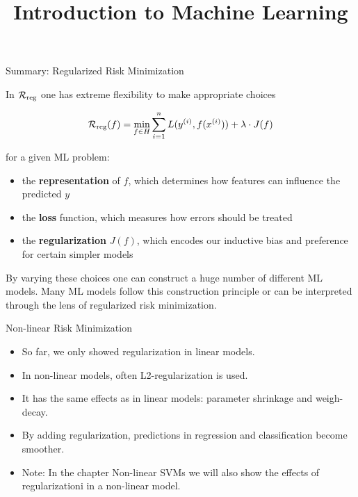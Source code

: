



\newcommand{\titlefigure}{figure_man/bayes_reg.png}
\newcommand{\learninggoals}{
  \item Know how regularization can be motivated from a Bayesian perspective
  \item Understand the correspondence between log-prior and regularization term
}

\title{Introduction to Machine Learning}
\date{}





\begin{vbframe}{Summary: Regularized Risk Minimization}

In $\mathcal{R}_{\text{reg}}$ one has extreme flexibility to make appropriate choices

$$
\mathcal{R}_{\text{reg}}(f)= \min_{f \in H} \sum_{i=1}^n L(y^{(i)}, f(x^{(i)})) + \lambda \cdot J(f)
$$

for a given ML problem:

\begin{itemize}
  \item the \textbf{representation} of $f$, which determines how features can influence the predicted $y$
  \item the \textbf{loss} function, which measures how errors should be treated
  \item the \textbf{regularization} $J(f)$, which encodes our inductive bias and preference for certain simpler models
\end{itemize}

By varying these choices one can construct a huge number of different ML models. Many ML models follow this construction principle or can be interpreted through the lens of regularized risk minimization.

\end{vbframe}



\begin{vbframe}{Non-linear Risk Minimization}

\begin{itemize}
  \item So far, we only showed regularization in linear models.
  \item In non-linear models, often L2-regularization is used. 
  \item It has the same effects as in linear models: parameter shrinkage and weigh-decay.
  \item By adding regularization, predictions in regression and classification become smoother. 
  \item Note: In the chapter Non-linear SVMs we will also show the effects of regularizationi in a non-linear model. 
\end{itemize}

\end{vbframe}


